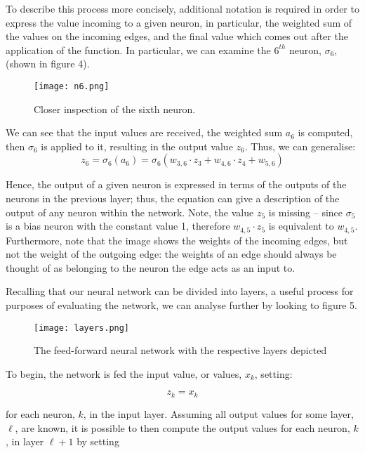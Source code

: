\documentclass[11pt]{article}
\begin{document}
To describe this process more concisely, additional notation is required in order to express the value incoming to a given neuron, in particular, the weighted sum of the values on the incoming edges, and the final value which comes out after the application of the function. In particular, we can examine the $6^{th}$ neuron, $\sigma_{6}$, (shown in figure 4).

\begin{figure}[h]
    \centering
    \texttt{[image: n6.png]}
    \caption{Closer inspection of the sixth neuron.}   
\end{figure}

We can see that the input values are received, the weighted sum $a_{6}$ is computed, then $\sigma_{6}$ is applied to it, resulting in the output value $z_{6}$. Thus, we can generalise: 
\begin{equation}z_{6} = \sigma_{6}(a_{6})=\sigma_{6}(w_{3,6}\cdot z_{3}+w_{4,6}\cdot z_{4}+w_{5,6}) \nonumber\end{equation}

Hence, the output of a given neuron is expressed in terms of the outputs of the neurons in the previous layer; thus, the equation can give a description of the output of any neuron within the network. Note, the value $z_{5}$ is missing – since $\sigma_{5}$ is a bias neuron with the constant value 1, therefore $w_{4,5}\cdot z_{5}$ is equivalent to $w_{4,5}$. Furthermore, note that the image shows the weights of the incoming edges, but not the weight of the outgoing edge: the weights of an edge should always be thought of as belonging to the neuron the edge acts as an input to.

Recalling that our neural network can be divided into layers, a useful process for purposes of evaluating the network, we can analyse further by looking to figure 5.

\begin{figure}[h]
    \centering
    \texttt{[image: layers.png]}
    \caption{The feed-forward neural network with the respective layers depicted}   
\end{figure}

To begin, the network is fed the input value, or values, $x_{k}$, setting:

\begin{equation}z_{k}=x_{k}\nonumber\end{equation}

for each neuron, $k$, in the input layer. Assuming all output values for some layer, $\ell$, are known, it is possible to then compute the output values for each neuron, $k$, in layer $\ell+1$ by setting
\end{document}
